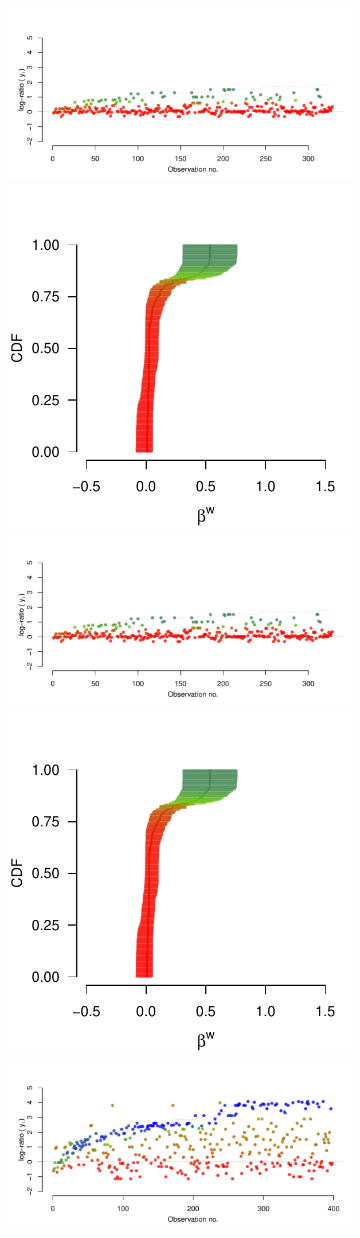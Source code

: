 \documentclass[9pt,twoside,lineno]{pnas-new}
\begin{document}
\begin{figure}
\begin{subfigure}{.44\linewidth}
		\includegraphics[width=.7\linewidth]{thread_max_55_3.pdf}
		\includegraphics[width=.28\linewidth]{beta_max_55_3.pdf}
		\includegraphics[width=.7\linewidth]{thread_max_55_3.pdf}
		\includegraphics[width=.28\linewidth]{beta_max_55_3.pdf}
		\includegraphics[width=.7\linewidth]{thread_max_1097_9.pdf}

\end{subfigure}
\end{figure}
\end{document}
